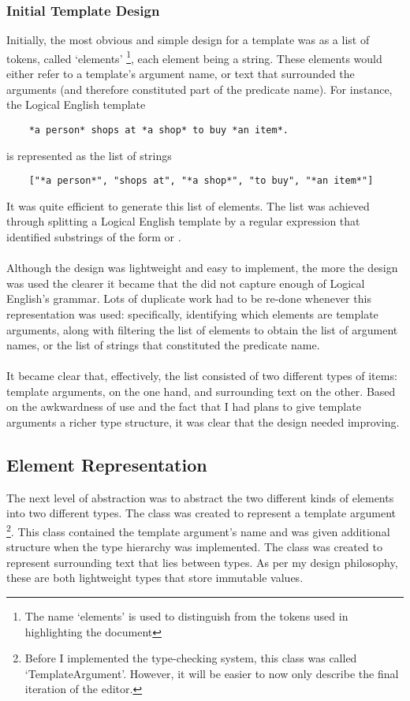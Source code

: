 \documentclass[../main.tex]{subfiles}
\begin{document}
\subsubsection{Initial Template Design}
Initially, the most obvious and simple design for a template was as a list of tokens, called `elements' \footnote{The name `elements' is used to distinguish from the tokens used in highlighting the document}, each element being a string. These elements would either refer to a template's argument name, or text that surrounded the arguments (and therefore constituted part of the predicate name). For instance, the Logical English template
\begin{lstlisting}
    *a person* shops at *a shop* to buy *an item*.
\end{lstlisting}
is represented as the list of strings
\begin{lstlisting} 
    ["*a person*", "shops at", "*a shop*", "to buy", "*an item*"]
\end{lstlisting}
It was quite efficient to generate this list of elements. The list was achieved through splitting a Logical English template by a regular expression that identified substrings of the form  or . 
\\
\\
Although the design was lightweight and easy to implement, the more the design was used the clearer it became that the did not capture enough of Logical English's grammar. Lots of duplicate work had to be re-done whenever this representation was used: specifically, identifying which elements are template arguments, along with filtering the list of elements to obtain the list of argument names, or the list of strings that constituted the predicate name. 
\\ 
\\
It became clear that, effectively, the list consisted of two different types of items: template arguments, on the one hand, and surrounding text on the other. Based on the awkwardness of use and the fact that I had plans to give template arguments a richer type structure, it was clear that the design needed improving.

\subsection{Element Representation}
The next level of abstraction was to abstract the two different kinds of elements into two different types.
The class  was created to represent a template argument \footnote{Before I implemented the type-checking system, this class was called `TemplateArgument'. However, it will be easier to now only describe the final iteration of the editor.}. This  class contained the template argument's name and was given additional structure when the type hierarchy was implemented. The class  was created to represent surrounding text that lies between types. As per my design philosophy, these are both lightweight types that store immutable values.
\end{document}
